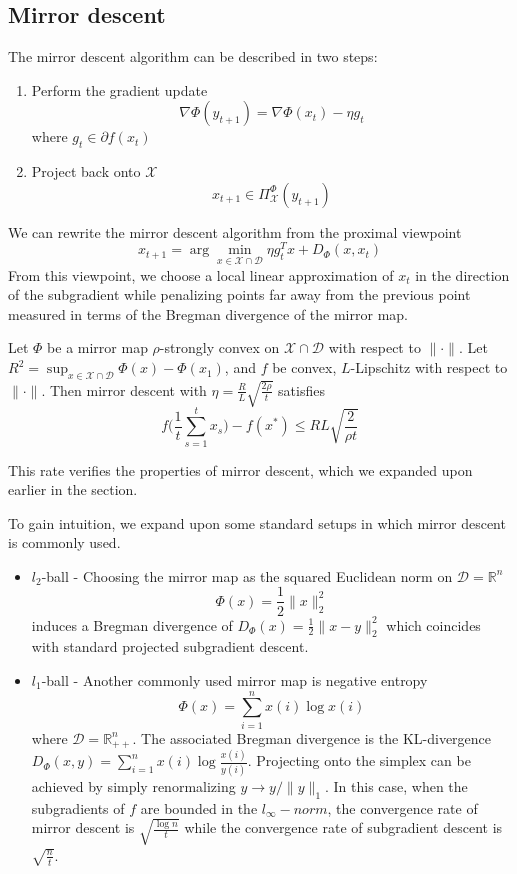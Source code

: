 \subsection{Mirror descent}
The mirror descent algorithm can be described in two steps:
\begin{enumerate}
\item Perform the gradient update
$$\nabla \Phi(y_{t+1}) = \nabla \Phi(x_t) - \eta g_t$$
where $g_t \in \partial f(x_t)$
\item Project back onto $\mathcal{X}$
$$x_{t+1} \in \Pi_{\mathcal{X}}^{\Phi}(y_{t+1})$$
\end{enumerate}

We can rewrite the mirror descent algorithm from the proximal viewpoint
\begin{equation*}
x_{t+1} = \arg\min_{x \in \mathcal{X}\cap \mathcal{D}} \eta g_t^Tx + D_{\Phi}(x,x_t)
\end{equation*}
From this viewpoint, we choose a local linear approximation of $x_t$ in the direction of the subgradient while penalizing points far away from the previous point measured in terms of the Bregman divergence of the mirror map.

\begin{theorem}
Let $\Phi$ be a mirror map $\rho$-strongly convex on $\mathcal{X} \cap \mathcal{D}$ with respect to $\|\cdot\|$. Let $R^2 = \sup_{x \in \mathcal{X}\cap \mathcal{D}} \Phi(x) - \Phi(x_1)$, and $f$ be convex, $L$-Lipschitz with respect to $\|\cdot\|$. Then mirror descent with $\eta = \frac{R}{L}\sqrt{\frac{2\rho}{t}}$ satisfies
\begin{equation}
f\Big(\frac{1}{t}\sum_{s=1}^t x_s\Big) - f(x^*) \leq RL\sqrt{\frac{2}{\rho t}}
\end{equation}
\end{theorem}
This rate verifies the properties of mirror descent, which we expanded upon earlier in the section.

To gain intuition, we expand upon some standard setups in which mirror descent is commonly used.
\begin{itemize}
\item $l_2$-ball - Choosing the mirror map as the squared Euclidean norm on $\mathcal{D} = \mathbb{R}^n$
$$\Phi(x) = \frac{1}{2}\|x\|_2^2$$
induces a Bregman divergence of $D_{\Phi}(x) = \frac{1}{2}\|x - y\|_2^2$ which coincides with standard projected subgradient descent.
\item $l_1$-ball - Another commonly used mirror map is negative entropy
$$\Phi(x) = \sum_{i=1}^n x(i) \log x(i)$$
where $\mathcal{D} = \mathbb{R}^n_{++}$. The associated Bregman divergence is the KL-divergence $D_{\Phi}(x,y) = \sum_{i=1}^n x(i) \log \frac{x(i)}{y(i)}$. Projecting onto the simplex can be achieved by simply renormalizing $y \rightarrow y/\|y\|_1$. In this case, when the subgradients of $f$ are bounded in the $l_{\infty}-norm$, the convergence rate of mirror descent is $\sqrt{\frac{\log n}{t}}$ while the convergence rate of subgradient descent is $\sqrt{\frac{n}{t}}$.
\end{itemize}


